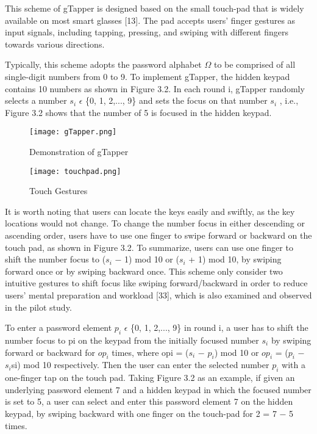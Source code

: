 \documentclass[12pt,a4paper,oneside]{report}
\begin{document}
This scheme of gTapper is designed based on the small
touch-pad that is widely available on most smart glasses [13].
The pad accepts users’ finger gestures as input signals,
including tapping, pressing, and swiping with different fingers
towards various directions.
\par 
Typically, this scheme adopts the password alphabet $\Omega$
to be comprised of all single-digit numbers from 0 to 9.
To implement gTapper, the hidden keypad contains 10 numbers
as shown in Figure 3.2. In each round i, gTapper randomly
selects a number $s_i$ $\epsilon$ \{0, 1, 2,..., 9\} and sets the focus
on that number $s_i$ , i.e., Figure 3.2 shows that the number
of 5 is focused in the hidden keypad.
\begin{figure}[H]
    \begin{center}
        \label{abc}
            \texttt{[image: gTapper.png]}
            \caption{ Demonstration of gTapper}
    \end{center}
\end{figure}
\begin{figure}[H]
    \begin{center}
        \label{abc}
            \texttt{[image: touchpad.png]}
            \caption{ Touch Gestures }
    \end{center}
\end{figure}

\par  It is worth noting
that users can locate the keys easily and swiftly, as the key
locations would not change. To change the number focus
in either descending or ascending order, users have to use
one finger to swipe forward or backward on the touch pad,
as shown in Figure 3.2. To summarize, users can use one
finger to shift the number focus to ($s_i$ − 1) mod 10 or
($s_i$ + 1) mod 10, by swiping forward once or by swiping
backward once. This scheme only consider two intuitive
gestures to shift focus like swiping forward/backward in order
to reduce users’ mental preparation and workload [33], which
is also examined and observed in the pilot study.
\par 
To enter a password element $p_i$ $\epsilon$ \{0, 1, 2,..., 9\} in round
i, a user has to shift the number focus to pi on the keypad
from the initially focused number $s_i$ by swiping forward or
backward for $op_i$ times, where opi = ($s_i$ − $p_i$) mod 10 or
$op_i$ = ($p_i$ − $s_i$si) mod 10 respectively. Then the user can enter
the selected number $p_i$ with a one-finger tap on the touch
pad. Taking Figure 3.2 as an example, if given an underlying
password element 7 and a hidden keypad in which the focused
number is set to 5, a user can select and enter this password
element 7 on the hidden keypad, by swiping backward with
one finger on the touch-pad for 2 = 7 − 5 times.\newpage
\end{document}
